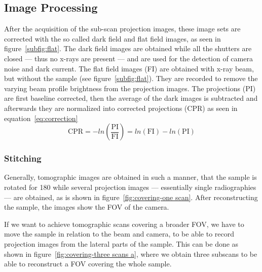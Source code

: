 \subsection{Image Processing}
\label{subsec:image processing}
After the acquisition of the sub-scan projection images, these image sets are corrected with the so called dark field and flat field images, as seen in figure~\ref{subfig:flat}. The dark field images are obtained while all the shutters are closed --- thus no x-rays are present --- and are used for the detection of camera noise and dark current. The flat field images (FI) are obtained with x-ray beam, but without the sample (see figure~\ref{subfig:flat}). They are recorded to remove the varying beam profile brightness from the projection images. The projections (PI) are first baseline corrected, then the average of the dark images is subtracted and afterwards they are normalized into corrected projections (CPR) as seen in equation~\ref{eq:correction}
\begin{equation}
\text{CPR}=-ln\left(\frac{\text{PI}}{\text{FI}}\right)=ln(\text{FI})-ln(\text{PI})
\label{eq:correction}
\end{equation}

\subsubsection{Stitching}
\label{subsec:stitching}
Generally, tomographic images are obtained in such a manner, that the sample is rotated for \unit{180}{\degree} while several projection images --- essentially single radiographies --- are obtained, as is shown in figure~\ref{fig:covering-one scan}. After reconstructing the sample, the images show the FOV of the camera.

\begin{figure*}[tb]
	\centering
	
	\caption{Covering the FOV -- one scan}
	\label{fig:covering-one scan}
\end{figure*}

If we want to achieve tomographic scans covering a broader FOV, we have to move the sample in relation to the beam and camera, to be able to record projection images from the lateral parts of the sample. This can be done as shown in figure~\ref{fig:covering-three scans a}, where we obtain three subscans to be able to reconstruct a FOV covering the whole sample.

\begin{figure*}[tb]
	\centering
	
	\caption{Covering the FOV -- three scans $\rightarrow$ sample has to move, explain that we still only do \unit{180}{\degree} scans!}
	\label{fig:covering-three scans a}
\end{figure*}

